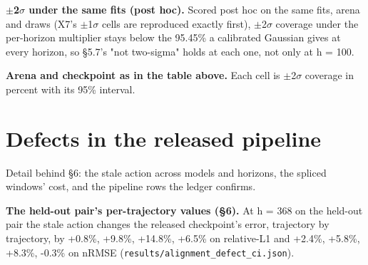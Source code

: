 \documentclass[10pt]{article}
\begin{document}
\textbf{$\pm$2$\sigma$ under the same fits (post hoc).} Scored post hoc on the same fits, arena and draws (X7's $\pm$1$\sigma$ cells are reproduced exactly first), $\pm$2$\sigma$ coverage under the per-horizon multiplier stays below the 95.45\% a calibrated Gaussian gives at every horizon, so \S{}5.7's "not two-sigma" holds at each one, not only at h = 100.

\begin{center}\small{}\end{center}

\textbf{Arena and checkpoint as in the table above.} Each cell is $\pm$2$\sigma$ coverage in percent with its 95\% interval.


\section{Defects in the released pipeline}

Detail behind \S{}6: the stale action across models and horizons, the spliced windows' cost, and the pipeline rows the ledger confirms.

\textbf{The held-out pair's per-trajectory values (\S{}6).} At h = 368 on the held-out pair the stale action changes the released checkpoint's error, trajectory by trajectory, by +0.8\%, +9.8\%, +14.8\%, +6.5\% on relative-L1 and +2.4\%, +5.8\%, +8.3\%, -0.3\% on nRMSE (\texttt{results/\allowbreak{}alignment\_\allowbreak{}defect\_\allowbreak{}ci\allowbreak{}.json}).
\end{document}
